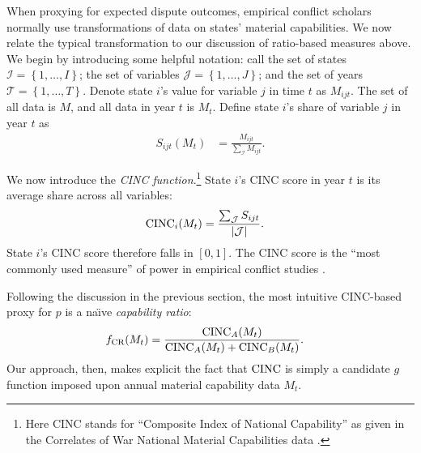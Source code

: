 When proxying for expected dispute outcomes, empirical conflict scholars normally use transformations of data on states' material capabilities.
We now relate the typical transformation to our discussion of ratio-based measures above.
We begin by introducing some helpful notation: call the set of states $\mathcal{I} = \left\{1, \ldots, I\right\}$; the set of variables $\mathcal{J} = \left\{1,\ldots,J\right\}$; and the set of years $\mathcal{T} = \left\{1,\ldots, T\right\}$.
Denote state $i$'s value for variable $j$ in time $t$ as $M_{ijt}$.
The set of all data is $M$, and all data in year $t$ is $M_t$.
Define state $i$'s share of variable $j$ in year $t$ as
\begin{align*}
  S_{ijt}(M_{t}) &= \frac{M_{ijt}}{\sum_{\mathcal{I}} M_{ijt}}.
\end{align*}

We now introduce the \emph{CINC function}.\footnote{Here CINC stands for ``Composite Index of National Capability'' as given in the Correlates of War National Material Capabilities data \citep{singer1972}.}
State $i$'s CINC score in year $t$ is its average share across all variables:
\begin{align*}
  \operatorname{CINC}_i(M_t) &= \frac{\sum_{\mathcal{J}} S_{ijt}}{\left|\mathcal{J}\right|}.
\end{align*}
State $i$'s CINC score therefore falls in $[0,1]$.
The CINC score is the ``most commonly used measure'' of power in empirical conflict studies \citep[212]{kadera2004}.

Following the discussion in the previous section, the most intuitive CINC-based proxy for $p$ is a na\"{\i}ve \emph{capability ratio}:
\begin{align*}
  f_{\text{CR}}(M_t) &= \frac{\operatorname{CINC}_A(M_t)}{\operatorname{CINC}_A(M_t) + \operatorname{CINC}_B(M_t)}.
\end{align*}
Our approach, then, makes explicit the fact that $\operatorname{CINC}$ is simply a candidate $g$ function imposed upon annual material capability data $M_t$.

